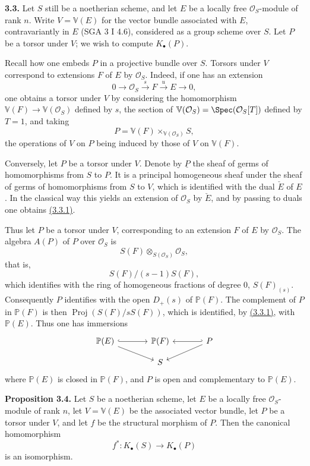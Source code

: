 \textbf{3.3.} Let $S$ still be a noetherian scheme, and let $E$ be a locally free $\mathcal O_S$-module of rank $n$. Write $V=\mathbb V(E)$ for the vector bundle associated with $E$, contravariantly in $E$ (SGA 3 I 4.6), considered as a group scheme over $S$. Let $P$ be a torsor under $V$; we wish to compute $K_\bullet(P)$.

Recall how one embeds $P$ in a projective bundle over $S$. Torsors under $V$ correspond to extensions $F$ of $E$ by $\mathcal O_S$. Indeed, if one has an extension
\[
0\longrightarrow\mathcal O_S\xrightarrow{s}F\xrightarrow{u}E\longrightarrow 0,
\tag{3.3.1}
\]
one obtains a torsor under $V$ by considering the homomorphism $\mathbb V(F)\to\mathbb V(\mathcal O_S)$ defined by $s$, the section of $\mathbb V(\mathcal O_S)=\Spec(\mathcal O_S[T])$ defined by $T=1$, and taking
\[
 P=\mathbb V(F)\times_{\mathbb V(\mathcal O_S)}S,
\]
the operations of $V$ on $P$ being induced by those of $V$ on $\mathbb V(F)$.

Conversely, let $P$ be a torsor under $V$. Denote by $\underline P$ the sheaf of germs of homomorphisms from $S$ to $P$. It is a principal homogeneous sheaf under the sheaf of germs of homomorphisms from $S$ to $V$, which is identified with the dual $\check E$ of $E$. In the classical way this yields an extension of $\mathcal O_S$ by $\check E$, and by passing to duals one obtains \hyperlink{sga6.e09.eq.3-3-1}{(3.3.1)}.

Thus let $P$ be a torsor under $V$, corresponding to an extension $F$ of $E$ by $\mathcal O_S$. The algebra $A(P)$ of $P$ over $\mathcal O_S$ is
\[
 S(F)\otimes_{S(\mathcal O_S)}\mathcal O_S,
\]
that is,
\[
 S(F)/(s-1)S(F),
\]
which identifies with the ring of homogeneous fractions of degree $0$, $S(F)_{(s)}$. Consequently $P$ identifies with the open $D_+(s)$ of $\mathbb P(F)$. The complement of $P$ in $\mathbb P(F)$ is then $\operatorname{Proj}(S(F)/sS(F))$, which is identified, by \hyperlink{sga6.e09.eq.3-3-1}{(3.3.1)}, with $\mathbb P(E)$. Thus one has immersions
\[
\begin{tikzcd}[column sep=large,row sep=small]
\mathbb P(E) \arrow[r,hook] \arrow[dr] & \mathbb P(F) & P \arrow[l,hook'] \arrow[dl]\\
& S &
\end{tikzcd}
\]
where $\mathbb P(E)$ is closed in $\mathbb P(F)$, and $P$ is open and complementary to $\mathbb P(E)$.

\textbf{Proposition 3.4.} Let $S$ be a noetherian scheme, let $E$ be a locally free $\mathcal O_S$-module of rank $n$, let $V=\mathbb V(E)$ be the associated vector bundle, let $P$ be a torsor under $V$, and let $f$ be the structural morphism of $P$. Then the canonical homomorphism
\[
 f^*:K_\bullet(S)\longrightarrow K_\bullet(P)
\]
is an isomorphism.


